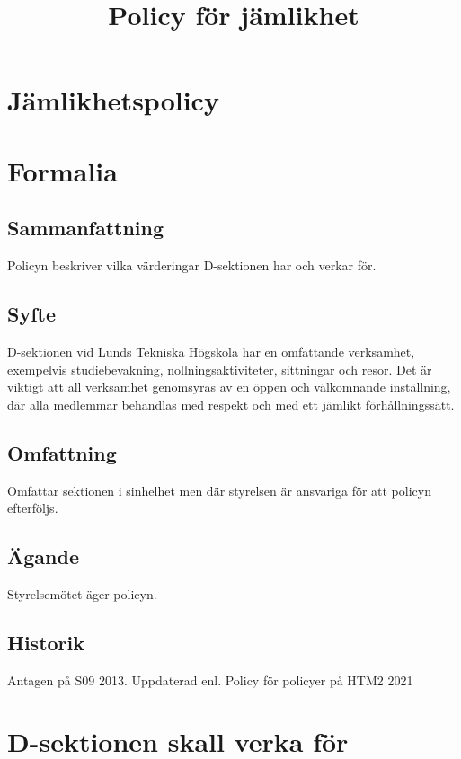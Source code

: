 \documentclass{dsekprotokoll}
\title{Policy för jämlikhet}
\author{}
\begin{document}
\section*{Jämlikhetspolicy}
\section{Formalia}
\subsection{Sammanfattning}
Policyn beskriver vilka värderingar D-sektionen har och verkar för.
\subsection{Syfte}
D-sektionen vid Lunds Tekniska Högskola har en omfattande verksamhet, exempelvis studiebevakning, nollningsaktiviteter, sittningar och resor. Det är viktigt att all verksamhet
genomsyras av en öppen och välkomnande inställning, där alla medlemmar behandlas med
respekt och med ett jämlikt förhållningssätt.
\subsection{Omfattning}
Omfattar sektionen i sinhelhet men där styrelsen är ansvariga för att policyn efterföljs.
\subsection{Ägande}
Styrelsemötet äger policyn.
\subsection{Historik}
Antagen på S09 2013.
Uppdaterad enl. Policy för policyer på HTM2 2021


\section{D-sektionen skall verka för}
\end{document}
